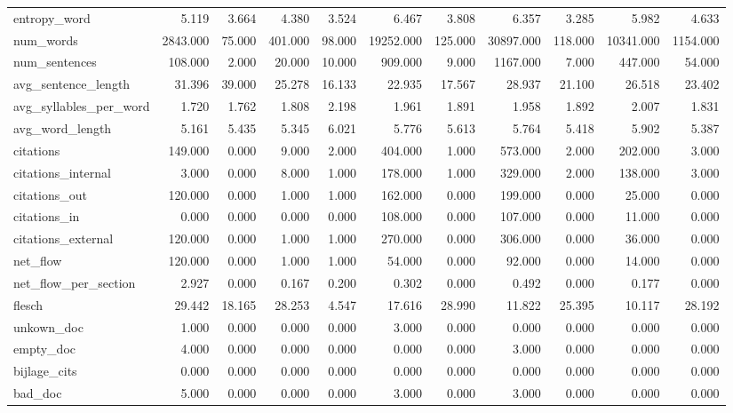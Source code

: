 \begin{tabular}{lrrrrrrrrrr}
\cline{1-11}
entropy\_word & 5.119 & 3.664 & 4.380 & 3.524 & 6.467 & 3.808 & 6.357 & 3.285 & 5.982 & 4.633 \\
\cline{1-11}
num\_words & 2843.000 & 75.000 & 401.000 & 98.000 & 19252.000 & 125.000 & 30897.000 & 118.000 & 10341.000 & 1154.000 \\
\cline{1-11}
num\_sentences & 108.000 & 2.000 & 20.000 & 10.000 & 909.000 & 9.000 & 1167.000 & 7.000 & 447.000 & 54.000 \\
\cline{1-11}
avg\_sentence\_length & 31.396 & 39.000 & 25.278 & 16.133 & 22.935 & 17.567 & 28.937 & 21.100 & 26.518 & 23.402 \\
\cline{1-11}
avg\_syllables\_per\_word & 1.720 & 1.762 & 1.808 & 2.198 & 1.961 & 1.891 & 1.958 & 1.892 & 2.007 & 1.831 \\
\cline{1-11}
avg\_word\_length & 5.161 & 5.435 & 5.345 & 6.021 & 5.776 & 5.613 & 5.764 & 5.418 & 5.902 & 5.387 \\
\cline{1-11}
citations & 149.000 & 0.000 & 9.000 & 2.000 & 404.000 & 1.000 & 573.000 & 2.000 & 202.000 & 3.000 \\
\cline{1-11}
citations\_internal & 3.000 & 0.000 & 8.000 & 1.000 & 178.000 & 1.000 & 329.000 & 2.000 & 138.000 & 3.000 \\
\cline{1-11}
citations\_out & 120.000 & 0.000 & 1.000 & 1.000 & 162.000 & 0.000 & 199.000 & 0.000 & 25.000 & 0.000 \\
\cline{1-11}
citations\_in & 0.000 & 0.000 & 0.000 & 0.000 & 108.000 & 0.000 & 107.000 & 0.000 & 11.000 & 0.000 \\
\cline{1-11}
citations\_external & 120.000 & 0.000 & 1.000 & 1.000 & 270.000 & 0.000 & 306.000 & 0.000 & 36.000 & 0.000 \\
\cline{1-11}
net\_flow & 120.000 & 0.000 & 1.000 & 1.000 & 54.000 & 0.000 & 92.000 & 0.000 & 14.000 & 0.000 \\
\cline{1-11}
net\_flow\_per\_section & 2.927 & 0.000 & 0.167 & 0.200 & 0.302 & 0.000 & 0.492 & 0.000 & 0.177 & 0.000 \\
\cline{1-11}
flesch & 29.442 & 18.165 & 28.253 & 4.547 & 17.616 & 28.990 & 11.822 & 25.395 & 10.117 & 28.192 \\
\cline{1-11}
unkown\_doc & 1.000 & 0.000 & 0.000 & 0.000 & 3.000 & 0.000 & 0.000 & 0.000 & 0.000 & 0.000 \\
\cline{1-11}
empty\_doc & 4.000 & 0.000 & 0.000 & 0.000 & 0.000 & 0.000 & 3.000 & 0.000 & 0.000 & 0.000 \\
\cline{1-11}
bijlage\_cits & 0.000 & 0.000 & 0.000 & 0.000 & 0.000 & 0.000 & 0.000 & 0.000 & 0.000 & 0.000 \\
\cline{1-11}
bad\_doc & 5.000 & 0.000 & 0.000 & 0.000 & 3.000 & 0.000 & 3.000 & 0.000 & 0.000 & 0.000 \\
\cline{1-11}
\bottomrule
\end{tabular}

